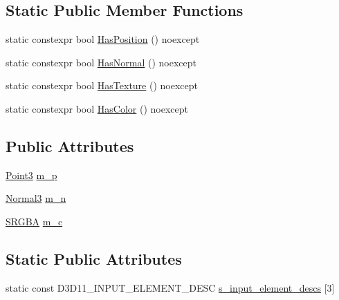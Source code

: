 \subsection*{Static Public Member Functions}
\begin{DoxyCompactItemize}
\item 
static constexpr bool \hyperlink{structmage_1_1rendering_1_1_vertex_position_normal_color_a1a40ced9702b3aa3a8f32ea932448aa1}{Has\+Position} () noexcept
\item 
static constexpr bool \hyperlink{structmage_1_1rendering_1_1_vertex_position_normal_color_a663883aaff79837d1abb1c5cb54d2340}{Has\+Normal} () noexcept
\item 
static constexpr bool \hyperlink{structmage_1_1rendering_1_1_vertex_position_normal_color_aef3b7dd4f11d7f2a78fe29c49b8bf6f5}{Has\+Texture} () noexcept
\item 
static constexpr bool \hyperlink{structmage_1_1rendering_1_1_vertex_position_normal_color_ae1d38a1d2e3f546c475849ec360f5317}{Has\+Color} () noexcept
\end{DoxyCompactItemize}
\subsection*{Public Attributes}
\begin{DoxyCompactItemize}
\item 
\hyperlink{structmage_1_1_point3}{Point3} \hyperlink{structmage_1_1rendering_1_1_vertex_position_normal_color_ad89961e1a0b0bd97f580a34709e4e05f}{m\+\_\+p}
\item 
\hyperlink{structmage_1_1_normal3}{Normal3} \hyperlink{structmage_1_1rendering_1_1_vertex_position_normal_color_abf35d5cb0057f76dbd6f153ee0f412f4}{m\+\_\+n}
\item 
\hyperlink{structmage_1_1_s_r_g_b_a}{S\+R\+G\+BA} \hyperlink{structmage_1_1rendering_1_1_vertex_position_normal_color_ac2ae96122976e9f8cfa7ba7e50cedcd5}{m\+\_\+c}
\end{DoxyCompactItemize}
\subsection*{Static Public Attributes}
\begin{DoxyCompactItemize}
\item 
static const D3\+D11\+\_\+\+I\+N\+P\+U\+T\+\_\+\+E\+L\+E\+M\+E\+N\+T\+\_\+\+D\+E\+SC \hyperlink{structmage_1_1rendering_1_1_vertex_position_normal_color_adadf05a78d26b87baef8a9c3cb80ae54}{s\+\_\+input\+\_\+element\+\_\+descs} \mbox{[}3\mbox{]}
\end{DoxyCompactItemize}


